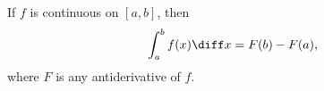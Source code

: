 \begin{frame}
\begin{theorem}
If $f$ is continuous on $[a, b]$, then
\[
\int_a^b f(x) \diff x = F(b) - F(a),
\]
where $F$ is any antiderivative of $f$.
\end{theorem}
\end{frame}
